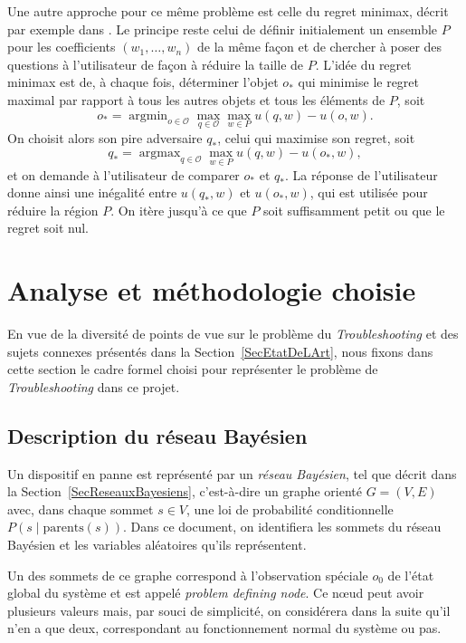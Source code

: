 \documentclass[a4paper,11pt]{article}
\theoremstyle{plain}
\theoremstyle{definition}
\DeclareMathOperator*{\argmax}{argmax}
\DeclareMathOperator*{\argmin}{argmin}
\begin{document}
Une autre approche pour ce même problème est celle du regret minimax, décrit par exemple dans \cite{Boutilier2006Constraint}. Le principe reste celui de définir initialement un ensemble $P$ pour les coefficients $(w_1, \dotsc,\allowbreak w_n)$ de la même façon et de chercher à poser des questions à l'utilisateur de façon à réduire la taille de $P$. L'idée du regret minimax est de, à chaque fois, déterminer l'objet $o_{\ast}$ qui minimise le regret maximal par rapport à tous les autres objets et tous les éléments de $P$, soit
\[o_{\ast} = \argmin_{o \in \mathcal O} \max_{q \in \mathcal O} \max_{w \in P} u(q, w) - u(o, w).\]
On choisit alors son pire adversaire $q_\ast$, celui qui maximise son regret, soit
\[q_{\ast} = \argmax_{q \in \mathcal O} \max_{w \in P} u(q, w) - u(o_\ast, w),\]
et on demande à l'utilisateur de comparer $o_\ast$ et $q_\ast$. La réponse de l'utilisateur donne ainsi une inégalité entre $u(q_\ast, w)$ et $u(o_\ast, w)$, qui est utilisée pour réduire la région $P$. On itère jusqu'à ce que $P$ soit suffisamment petit ou que le regret soit nul.

\section{Analyse et méthodologie choisie}
\label{SecMethodologie}

En vue de la diversité de points de vue sur le problème du \emph{Troubleshooting} et des sujets connexes présentés dans la Section~\ref{SecEtatDeLArt}, nous fixons dans cette section le cadre formel choisi pour représenter le problème de \emph{Troubleshooting} dans ce projet.

\subsection{Description du réseau Bayésien}
\label{SecBayesTroubleshooting}

Un dispositif en panne est représenté par un \emph{réseau Bayésien}, tel que décrit dans la Section~\ref{SecReseauxBayesiens}, c'est-à-dire un graphe orienté $G = (V, E)$ avec, dans chaque sommet $s \in V$, une loi de probabilité conditionnelle $P(s \mid \text{parents}(s))$. Dans ce document, on identifiera les sommets du réseau Bayésien et les variables aléatoires qu'ils représentent.

Un des sommets de ce graphe correspond à l'observation spéciale $o_0$ de l'état global du système et est appelé \emph{problem defining node}. Ce nœud peut avoir plusieurs valeurs mais, par souci de simplicité, on considérera dans la suite qu'il n'en a que deux, correspondant au fonctionnement normal du système ou pas.
\end{document}
